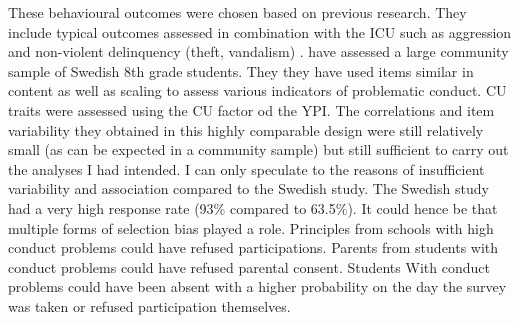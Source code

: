 \documentclass[a4paper,12pt]{article} %
\begin{document}
These behavioural outcomes were chosen based on previous research. 
They include typical outcomes assessed in combination with the ICU such as aggression and non-violent delinquency (theft, vandalism) \parencite{cardinale_reliability_2017}.
\textcites{andershed_psychopathic_2012} have assessed a large community sample of Swedish 8th grade students.
They they have used items similar in content as well as scaling to assess various indicators of problematic conduct. CU traits were assessed using the CU factor od the YPI.
The correlations and item variability they obtained in this highly comparable design were still relatively small (as can be expected in a community sample) but still sufficient to carry out the analyses I had intended. 
I can only speculate to the reasons of insufficient variability and association compared to the Swedish study. 
The Swedish study had a very high response rate (93\% compared to 63.5\%). 
It could hence be that multiple forms of selection bias played a role.
Principles from schools with high conduct problems could have refused participations. 
Parents from students with conduct problems could have refused parental consent. 
Students With conduct problems could have been absent with a higher probability on the day the survey was taken or refused participation themselves.
  
\end{document}
